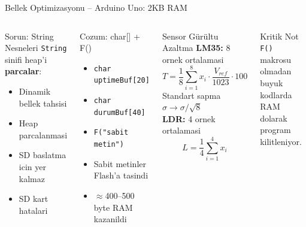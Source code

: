 \begin{frame}{Bellek Optimizasyonu -- Arduino Uno: 2KB RAM}
  \begin{columns}[T]
      \begin{block}{Sorun: String Nesneleri}
        \small
        \texttt{String} sinifi heap'i \textbf{parcalar}:
        \begin{itemize}
          \item Dinamik bellek tahsisi
          \item Heap parcalanmasi
          \item SD baslatma icin yer kalmaz
          \item[\ding{55}] SD kart hatalari
        \end{itemize}
      \end{block}
      \vspace{6pt}
      \begin{block}{Cozum: char{[}{]} + F()}
        \small
        \begin{itemize}
          \item[\ding{51}] \texttt{char uptimeBuf[20]}
          \item[\ding{51}] \texttt{char durumBuf[40]}
          \item[\ding{51}] \texttt{F("sabit metin")}
          \item[] Sabit metinler Flash'a tasindi
          \item[] $\approx$400--500 byte RAM kazanildi
        \end{itemize}
      \end{block}

      \begin{block}{Sensor Gürültu Azaltma}
        \small
        \textbf{LM35:} 8 ornek ortalamasi
        \[ T = \frac{1}{8}\sum_{i=1}^{8} x_i \cdot \frac{V_{ref}}{1023} \cdot 100 \]
        Standart sapma $\sigma \to \sigma/\sqrt{8}$\\[6pt]
        \textbf{LDR:} 4 ornek ortalamasi
        \[ L = \frac{1}{4}\sum_{i=1}^{4} x_i \]
      \end{block}
      \vspace{6pt}
      \begin{alertblock}{Kritik Not}
        \small \texttt{F()} makrosu olmadan buyuk
        kodlarda RAM dolarak program kilitleniyor.
      \end{alertblock}
  \end{columns}
\end{frame}
